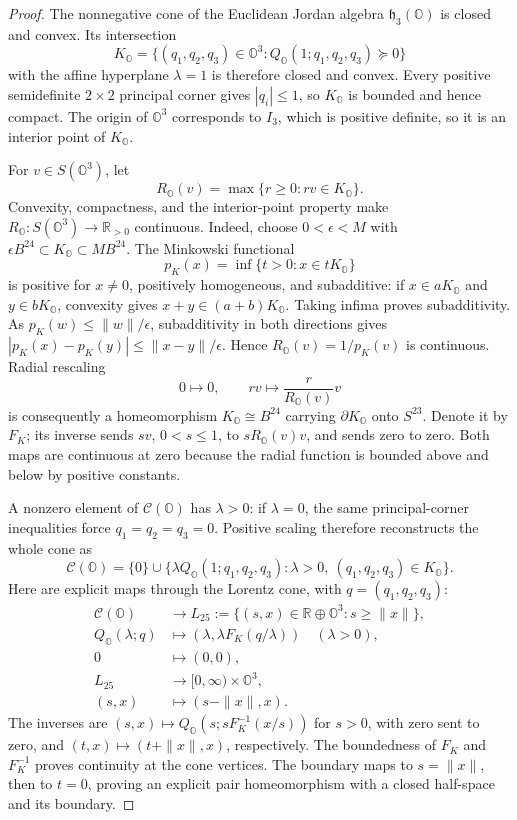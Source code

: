 \begin{proof}
The nonnegative cone of the Euclidean Jordan algebra
\(\mathfrak h_3(\mathbb O)\) is closed and convex.  Its intersection
\[
 K_{\mathbb O}=\{(q_1,q_2,q_3)\in\mathbb O^3:
              Q_{\mathbb O}(1;q_1,q_2,q_3)\succeq0\}
\]
with the affine hyperplane \(\lambda=1\) is therefore closed and convex.
Every positive semidefinite \(2\times2\) principal corner gives
\(|q_i|\le1\), so \(K_{\mathbb O}\) is bounded and hence compact.
The origin of \(\mathbb O^3\) corresponds to \(I_3\), which is positive
definite, so it is an interior point of \(K_{\mathbb O}\).

For \(v\in S(\mathbb O^3)\), let
\[
 R_{\mathbb O}(v)=\max\{r\ge0:rv\in K_{\mathbb O}\}.
\]
Convexity, compactness, and the interior-point property make
\(R_{\mathbb O}:S(\mathbb O^3)\to\mathbb R_{>0}\) continuous.  Indeed, choose
\(0<\epsilon<M\) with
\(\epsilon B^{24}\subset K_{\mathbb O}\subset M B^{24}\).  The Minkowski
functional
\[
 p_K(x)=\inf\{t>0:x\in tK_{\mathbb O}\}
\]
is positive for \(x\ne0\), positively homogeneous, and subadditive:
if \(x\in aK_{\mathbb O}\) and \(y\in bK_{\mathbb O}\), convexity gives
\(x+y\in(a+b)K_{\mathbb O}\).  Taking infima proves subadditivity.
As \(p_K(w)\le\|w\|/\epsilon\), subadditivity in both directions gives
\(|p_K(x)-p_K(y)|\le\|x-y\|/\epsilon\).  Hence
\(R_{\mathbb O}(v)=1/p_K(v)\) is continuous.  Radial rescaling
\[
 0\longmapsto0,\qquad rv\longmapsto
 \frac{r}{R_{\mathbb O}(v)}v
\]
is consequently a homeomorphism \(K_{\mathbb O}\cong B^{24}\) carrying
\(\partial K_{\mathbb O}\) onto \(S^{23}\).  Denote it by \(F_K\); its
inverse sends \(sv\), \(0<s\le1\), to \(sR_{\mathbb O}(v)v\), and sends
zero to zero.  Both maps are continuous at zero because the radial
function is bounded above and below by positive constants.

A nonzero element of \(\mathcal C(\mathbb O)\) has \(\lambda>0\): if
\(\lambda=0\), the same principal-corner inequalities force
\(q_1=q_2=q_3=0\).  Positive scaling therefore reconstructs the whole
cone as
\[
 \mathcal C(\mathbb O)=\{0\}\cup
 \{\lambda Q_{\mathbb O}(1;q_1,q_2,q_3):
       \lambda>0,\ (q_1,q_2,q_3)\in K_{\mathbb O}\}.
\]
Here are explicit maps through the Lorentz cone, with
\(q=(q_1,q_2,q_3)\):
\[
 \begin{aligned}
 \mathcal C(\mathbb O)&\longrightarrow
       L_{25}:=\{(s,x)\in\mathbb R\oplus\mathbb O^3:s\ge\|x\|\},\\
 Q_{\mathbb O}(\lambda;q)&\longmapsto
       (\lambda,\lambda F_K(q/\lambda))\quad(\lambda>0),\\
 0&\longmapsto(0,0),\\
 L_{25}&\longrightarrow[0,\infty)\times\mathbb O^3,\\
 (s,x)&\longmapsto(s-\|x\|,x).
 \end{aligned}
\]
The inverses are \((s,x)\mapsto Q_{\mathbb O}(s;sF_K^{-1}(x/s))\) for
\(s>0\), with zero sent to zero, and
\((t,x)\mapsto(t+\|x\|,x)\), respectively.  The boundedness of
\(F_K\) and \(F_K^{-1}\) proves continuity at the cone vertices.
The boundary maps to \(s=\|x\|\), then to \(t=0\), proving an explicit
pair homeomorphism with a closed half-space and its boundary.


\end{proof}

